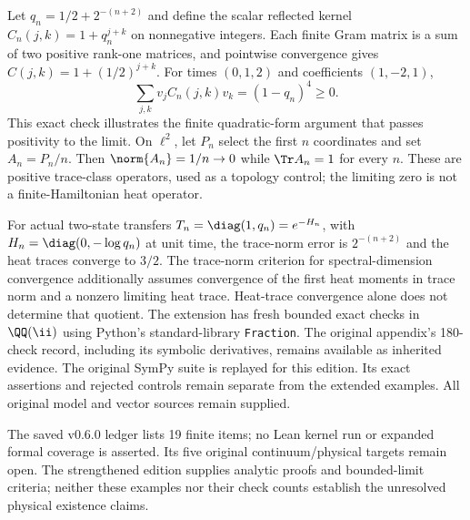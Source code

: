 Let $q_n=1/2+2^{-(n+2)}$ and define the scalar reflected kernel $C_n(j,k)=1+q_n^{j+k}$ on nonnegative integers. Each finite Gram matrix is a sum of two positive rank-one matrices, and pointwise convergence gives $C(j,k)=1+(1/2)^{j+k}$. For times $(0,1,2)$ and coefficients $(1,-2,1)$,
\[
\sum_{j,k}v_jC_n(j,k)v_k=(1-q_n)^4\geq0.
\]
This exact check illustrates the finite quadratic-form argument that passes positivity to the limit.
On $\ell^2$, let $P_n$ select the first $n$ coordinates and set $A_n=P_n/n$. Then $\norm{A_n}=1/n\to0$ while $\Tr A_n=1$ for every $n$. These are positive trace-class operators, used as a topology control; the limiting zero is not a finite-Hamiltonian heat operator.

For actual two-state transfers $T_n=\diag(1,q_n)=e^{-H_n}$, with $H_n=\diag(0,-\log q_n)$ at unit time, the trace-norm error is $2^{-(n+2)}$ and the heat traces converge to $3/2$. The trace-norm criterion for spectral-dimension convergence additionally assumes convergence of the first heat moments in trace norm and a nonzero limiting heat trace. Heat-trace convergence alone does not determine that quotient.
The extension has fresh bounded exact checks in $\QQ(\ii)$ using Python's standard-library \texttt{Fraction}. The original appendix's 180-check record, including its symbolic derivatives, remains available as inherited evidence. The original SymPy suite is replayed for this edition. Its exact assertions and rejected controls remain separate from the extended examples. All original model and vector sources remain supplied.

The saved v0.6.0 ledger lists 19 finite items; no Lean kernel run or expanded formal coverage is asserted. Its five original continuum/physical targets remain open. The strengthened edition supplies analytic proofs and bounded-limit criteria; neither these examples nor their check counts establish the unresolved physical existence claims.
